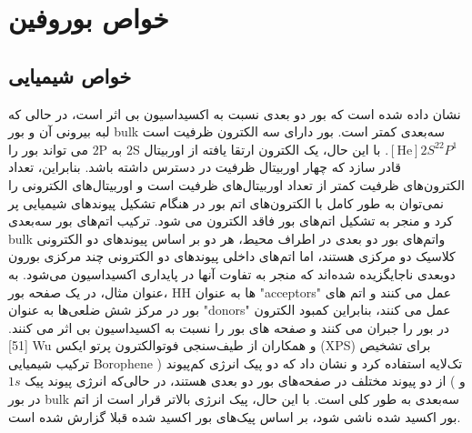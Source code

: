 \section{خواص بوروفین}
\subsection{خواص شیمیایی}
نشان داده شده است که بور دو بعدی نسبت به اکسیداسیون بی اثر است، در حالی که لبه بیرونی آن و بور \gls{bulk} سه‌بعدی کمتر است.\cite{fengExperimentalRealizationTwodimensional2016} بور دارای سه الکترون ظرفیت است $[\text{He}]2S^22P^1$. با این حال، یک الکترون ارتقا یافته از اوربیتال $\text{2S}$ به $\text{2P}$ می تواند بور را قادر سازد که چهار اوربیتال ظرفیت در دسترس داشته باشد. بنابراین، تعداد الکترون‌های ظرفیت کمتر از تعداد اوربیتال‌های ظرفیت است و اوربیتال‌های الکترونی را نمی‌توان به طور کامل با الکترون‌های اتم بور در هنگام تشکیل پیوندهای شیمیایی پر کرد و منجر به تشکیل اتم‌های بور فاقد الکترون می شود. ترکیب اتم‌های بور سه‌بعدی \gls{bulk} واتم‌های بور دو بعدی در اطراف محیط، هر دو بر اساس پیوندهای دو الکترونی کلاسیک دو مرکزی هستند، اما اتم‌های داخلی پیوندهای دو الکترونی چند مرکزی بورون دوبعدی ناجایگزیده شده‌اند که منجر به تفاوت آنها در پایداری اکسیداسیون می‌شود. \cite{zhangTwodimensionalBoronStructures2017} به عنوان مثال، در یک صفحه بور، \glsdesc{HH} ها به عنوان "\gls{acceptors}" عمل می کنند و اتم های بور در مرکز شش ضلعی‌ها به عنوان "\gls{donors}" عمل می کنند، بنابراین کمبود الکترون در بور را جبران می کنند و صفحه های بور را نسبت به اکسیداسیون بی اثر می کنند.[51] \gls{Wu} و همکاران\cite{fengExperimentalRealizationTwodimensional2016} از طیف‌سنجی فوتوالکترون پرتو ایکس (\gls{XPS}) برای تشخیص ترکیب شیمیایی \gls{Borophene} تک‌لایه استفاده کرد و نشان داد که دو پیک انرژی کم‌پیوند ( و ) از دو پیوند  مختلف در صفحه‌های بور دو بعدی هستند، در حالی‌که انرژی پیوند پیک $1s$ در بور \gls{bulk} سه‌بعدی به طور کلی  است. با این حال، پیک انرژی بالاتر  قرار است از اتم بور اکسید شده ناشی شود، بر اساس پیک‌های بور اکسید شده قبلا گزارش شده است.
  
